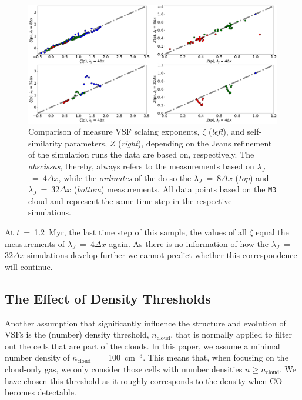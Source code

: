 \begin{figure}
	\centering
    \includegraphics[width=\textwidth]{comp_jeans.pdf}
    \caption{Comparison of measure VSF sclaing exponents, $\zeta$ (\textit{left}), and self-similarity parameters, $Z$ (\textit{right}), depending on the Jeans refinement of the simulation runs the data are based on, respectively. The \textit{abscissas}, thereby, always refers to the measurements based on $\lambda_J$~=~$4\Delta{}x$, while the \textit{ordinates} of the do so the $\lambda_J$~=~$8\Delta{}x$ (\textit{top}) and $\lambda_J$~=~$32\Delta{}x$ (\textit{bottom}) measurements. All data points based on the \texttt{M3} cloud and represent the same time step in the respective simulations. 
    }
    \label{pic:results:jeans_comp}
\end{figure}

At $t$~=~1.2~Myr, the last time step of this sample, the values of all $\zeta$ equal the measurements of $\lambda_J$~=~$4\Delta{}x$ again.
As there is no information of how the $\lambda_J$~=~$32\Delta{}x$ simulations develop further we cannot predict whether this correspondence will continue. 



\subsection{The Effect of Density Thresholds}\label{results:densthres}

Another assumption that significantly influence the structure and evolution of VSFs is the (number) density threshold, $n_\mathrm{cloud}$, that is normally applied to filter out the cells that are part of the clouds.
In this paper, we assume a minimal number density of $n_\mathrm{cloud}~=$~100~cm$^{-3}$.
This means that, when focusing on the cloud-only gas, we only consider those cells with number densities $n \geq n_\mathrm{cloud}$.
We have chosen this threshold as it roughly corresponds to the density when CO becomes detectable.

